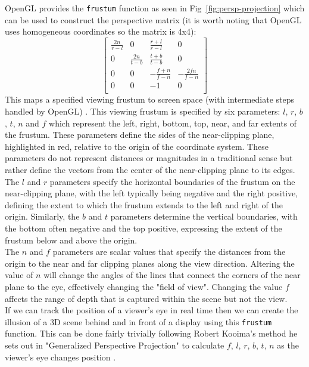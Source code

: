 OpenGL provides the \texttt{frustum} function as seen in Fig~\ref{fig:persp-projection} which can be used to construct the perspective matrix (it is worth noting that OpenGL uses homogeneous coordinates so the matrix is 4x4):     
\[
    \begin{bmatrix}
        \frac{2n}{r-l} & 0              & \frac{r+l}{r-l}  & 0                \\
        0              & \frac{2n}{t-b} & \frac{t+b}{t-b}  & 0                \\
        0              & 0              & -\frac{f+n}{f-n} & -\frac{2fn}{f-n} \\
        0              & 0              & -1               & 0                \\
    \end{bmatrix}
\] 
This maps a specified viewing frustum to screen space (with intermediate steps handled by OpenGL) \cite{hearn2004computer}. This viewing frustum is specified by six parameters: $l$, $r$, $b$, $t$, $n$ and $f$ which represent the left, right, bottom, top, near, and far extents of the frustum. These parameters define the sides of the near-clipping plane, highlighted in red, relative to the origin of the coordinate system. These parameters do not represent distances or magnitudes in a traditional sense but rather define the vectors from the center of the near-clipping plane to its edges. \\


The $l$ and $r$ parameters specify the horizontal boundaries of the frustum on the near-clipping plane, with the left typically being negative and the right positive, defining the extent to which the frustum extends to the left and right of the origin. Similarly, the $b$ and $t$ parameters determine the vertical boundaries, with the bottom often negative and the top positive, expressing the extent of the frustum below and above the origin. \\

The $n$ and $f$ parameters are scalar values that specify the distances from the origin to the near and far clipping planes along the view direction. Altering the value of $n$ will change the angles of the lines that connect the corners of the near plane to the eye, effectively changing the "field of view". Changing the value $f$ affects the range of depth that is captured within the scene but not the view. \\

If we can track the position of a viewer's eye in real time then we can create the illusion of a 3D scene behind and in front of a display using this \texttt{frustum} function. This can be done fairly trivially following Robert Kooima's method he sets out in "Generalized Perspective Projection" to calculate $f$, $l$, $r$, $b$, $t$, $n$ as the viewer's eye changes position \cite{kooima2009generalized}. 

